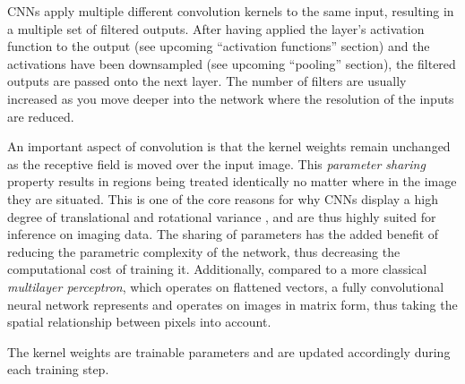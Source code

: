 CNNs apply multiple different convolution kernels to the same input, resulting in a multiple set of filtered outputs.
After having applied the layer's activation function to the output (see upcoming \enquote{activation functions} section) and the activations have been downsampled (see upcoming \enquote{pooling} section), the filtered outputs are passed onto the next layer.
The number of filters are usually increased as you move deeper into the network where the resolution of the inputs are reduced.

An important aspect of convolution is that the kernel weights remain unchanged as the receptive field is moved over the input image.
This \textit{parameter sharing} property \cite{visint-cnn} results in regions being treated identically no matter where in the image they are situated.
This is one of the core reasons for why CNNs display a high degree of translational and rotational variance \cite{cnn-translational-invariance}, and are thus highly suited for inference on imaging data.
The sharing of parameters has the added benefit of reducing the parametric complexity of the network, thus decreasing the computational cost of training it.
Additionally, compared to a more classical \textit{multilayer perceptron}, which operates on flattened vectors, a fully convolutional neural network represents and operates on images in matrix form, thus taking the spatial relationship between pixels into account.


The kernel weights are trainable parameters and are updated accordingly during each training step.
